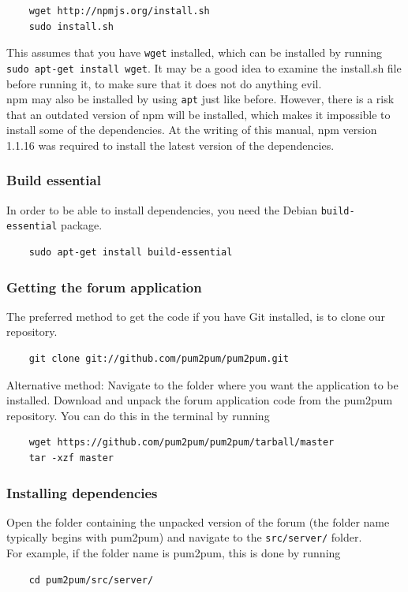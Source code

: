 \documentclass[a4paper, 12pt, titlepage]{article}
\begin{document}
	\begin{lstlisting}
	wget http://npmjs.org/install.sh
	sudo install.sh
	\end{lstlisting}

	This assumes that you have \lstinline{wget} installed, which can be installed by running \lstinline{sudo apt-get install wget}. It may be a good idea to examine the install.sh file before running it, to make sure that it does not do anything evil.\\

	npm may also be installed by using \lstinline{apt} just like before. However, there is a risk that an outdated version of npm will be installed, which makes it impossible to install some of the dependencies. At the writing of this manual, npm version 1.1.16 was required to install the latest version of the dependencies.

	\subsubsection{Build essential}
	In order to be able to install dependencies, you need the Debian \lstinline{build-essential} package.

	\begin{lstlisting}
	sudo apt-get install build-essential
	\end{lstlisting}


	\subsubsection{Getting the forum application}

	The preferred method to get the code if you have Git installed, is to clone our repository.
	\begin{lstlisting}
	git clone git://github.com/pum2pum/pum2pum.git
	\end{lstlisting}

	Alternative method: Navigate to the folder where you want the application to be installed. Download and unpack the forum application code from the pum2pum repository. You can do this in the terminal by running

	\begin{lstlisting}
	wget https://github.com/pum2pum/pum2pum/tarball/master
	tar -xzf master
	\end{lstlisting}


	\subsubsection{Installing dependencies}
	Open the folder containing the unpacked version of the forum (the folder name typically begins with pum2pum) and navigate to the \lstinline{src/server/} folder.\\
	For example, if the folder name is pum2pum, this is done by running
	\begin{lstlisting}
	cd pum2pum/src/server/
	\end{lstlisting}
\end{document}
